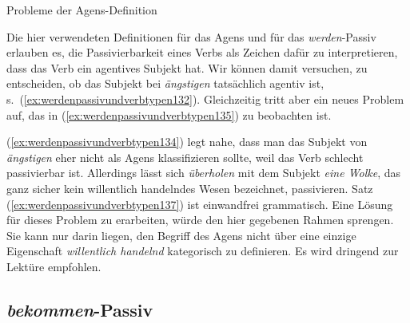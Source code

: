 \begin{Vertiefung}{Probleme der Agens-Definition}

  \label{vert:agensprobleme}

\noindent Die hier verwendeten Definitionen für das Agens und für das \textit{werden}-Passiv erlauben es, die Passivierbarkeit eines Verbs als Zeichen dafür zu interpretieren, dass das Verb ein agentives Subjekt hat.
Wir können damit versuchen, zu entscheiden, ob das Subjekt bei \textit{ängstigen} tatsächlich agentiv ist, s.\ (\ref{ex:werdenpassivundverbtypen132}).
Gleichzeitig tritt aber ein neues Problem auf, das in (\ref{ex:werdenpassivundverbtypen135}) zu beobachten ist.

\begin{exe}
  \ex\label{ex:werdenpassivundverbtypen132}
  \begin{xlist}
  \end{xlist}
  \ex\label{ex:werdenpassivundverbtypen135}
  \begin{xlist}
  \end{xlist}
\end{exe}

(\ref{ex:werdenpassivundverbtypen134}) legt nahe, dass man das Subjekt von \textit{ängstigen} eher nicht als Agens klassifizieren sollte, weil das Verb schlecht passivierbar ist.
Allerdings lässt sich \textit{überholen} mit dem Subjekt \textit{eine Wolke}, das ganz sicher kein willentlich handelndes Wesen bezeichnet, passivieren.
Satz (\ref{ex:werdenpassivundverbtypen137}) ist einwandfrei grammatisch.
Eine Lösung für dieses Problem zu erarbeiten, würde den hier gegebenen Rahmen sprengen.
Sie kann nur darin liegen, den Begriff des Agens nicht über eine einzige Eigenschaft \textit{willentlich handelnd} kategorisch zu definieren.
Es wird dringend \citet{Dowty1991} zur Lektüre empfohlen.

\end{Vertiefung}

\subsection{\textit{bekommen}-Passiv}
\label{sec:bekommenpassiv}

